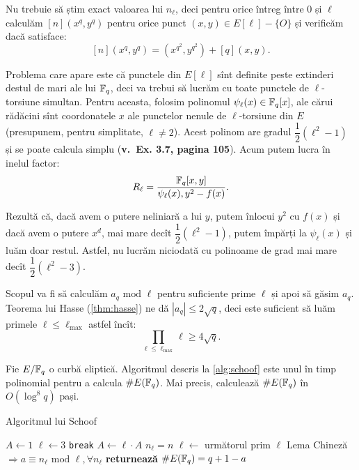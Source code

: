 Nu trebuie să știm exact valoarea lui $ n_\ell $, deci pentru orice întreg
între 0 și $ \ell $ calculăm $ [n](x^q, y^q) $ pentru orice punct
$ (x, y) \in E[\ell] - \{ O \} $ și verificăm dacă satisface:
\[
    [n](x^q, y^q) = (x^{q^2}, y^{q^2}) + [q](x, y).
\]

Problema care apare este că punctele din $ E[\ell] $ sînt definite
peste extinderi destul de mari ale lui $ \mathbb{F}_q $, deci va trebui
să lucrăm cu toate punctele de $ \ell $-torsiune simultan. Pentru aceasta,
folosim polinomul $ \psi_\ell(x) \in \mathbb{F}_q[x] $, ale cărui rădăcini
sînt coordonatele $ x $ ale punctelor nenule de $ \ell $-torsiune
din $ E $ (presupunem, pentru simplitate, $ \ell \neq 2 $). Acest
polinom are gradul $ \dfrac{1}{2}(\ell^2 - 1) $ și se poate calcula
simplu ({\color{red}\textbf{v.\ Ex. 3.7, pagina 105}}). Acum putem lucra
în inelul factor:
\[
    R_\ell = \dfrac{\mathbb{F}_q[x, y]}{\psi_\ell(x), y^2 - f(x)}.
\]

Rezultă că, dacă avem o putere neliniară a lui $ y $, putem înlocui
$ y^2 $ cu $ f(x) $ și dacă avem o putere $ x^d $, mai mare decît
$ \dfrac{1}{2}(\ell^2 - 1) $, putem împărți la $ \psi_\ell(x) $ și luăm
doar restul. Astfel, nu lucrăm niciodată cu polinoame de grad mai mare
decît $ \dfrac{1}{2}(\ell^2 - 3) $.

Scopul va fi să calculăm $ a_q \text{ mod } \ell $ pentru suficiente
prime $ \ell $ și apoi să găsim $ a_q $. Teorema lui Hasse (\ref{thm:hasse})
ne dă $ |a_q| \leq 2 \sqrt{q} $, deci este suficient să luăm primele
$ \ell \leq \ell_{\max} $ astfel încît:
\[
    \prod_{\ell \leq \ell_{\max}} \ell \geq 4 \sqrt{q}.
\]

\begin{theorem}\label{thm:schoof}
    Fie $ E/\mathbb{F}_q $ o curbă eliptică. Algoritmul descris la \ref{alg:schoof} este
    unul în timp polinomial pentru a calcula $ \# E(\mathbb{F}_q) $. Mai precis,
    calculează $ \# E(\mathbb{F}_q) $ în $ O(\log^8 q) $ pași.
\end{theorem}

\begin{algorithm}
  \caption{Algoritmul lui Schoof}
  \begin{algorithmic}[1]
      \State $ A \gets 1 $
      \State $ \ell \gets 3 $
            \texttt{break}
          \EndIf
        \EndWhile
        \State $ A \gets \ell \cdot A $
        \State $ n_\ell = n $
        \State $ \ell \gets $ următorul prim $ \ell $
      \EndWhile
      \State Lema Chineză $ \Rightarrow a \equiv n_\ell \text{ mod } \ell, \forall n_\ell $
      \State \textbf{returnează} $ \# E(\mathbb{F}_q) = q + 1 - a $
    \EndProcedure
  \end{algorithmic}
  \label{alg:schoof}
\end{algorithm}

